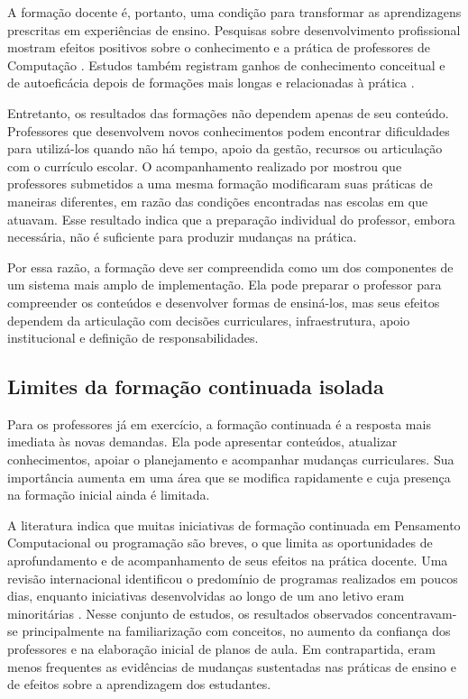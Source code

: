 A formação docente é, portanto, uma condição para transformar as aprendizagens prescritas em experiências de ensino. Pesquisas sobre desenvolvimento profissional mostram efeitos positivos sobre o conhecimento e a prática de professores de Computação \cite{ma2025effectiveness}. Estudos também registram ganhos de conhecimento conceitual e de autoeficácia depois de formações mais longas e relacionadas à prática \cite{nugent2022developing,liu2025building}.

Entretanto, os resultados das formações não dependem apenas de seu conteúdo. Professores que desenvolvem novos conhecimentos podem encontrar dificuldades para utilizá-los quando não há tempo, apoio da gestão, recursos ou articulação com o currículo escolar. O acompanhamento realizado por  mostrou que professores submetidos a uma mesma formação modificaram suas práticas de maneiras diferentes, em razão das condições encontradas nas escolas em que atuavam. Esse resultado indica que a preparação individual do professor, embora necessária, não é suficiente para produzir mudanças na prática.

Por essa razão, a formação deve ser compreendida como um dos componentes de um sistema mais amplo de implementação. Ela pode preparar o professor para compreender os conteúdos e desenvolver formas de ensiná-los, mas seus efeitos dependem da articulação com decisões curriculares, infraestrutura, apoio institucional e definição de responsabilidades.

\subsection{Limites da formação continuada isolada}
\label{subsec:limites-formacao-continuada}

Para os professores já em exercício, a formação continuada é a resposta mais imediata às novas demandas. Ela pode apresentar conteúdos, atualizar conhecimentos, apoiar o planejamento e acompanhar mudanças curriculares. Sua importância aumenta em uma área que se modifica rapidamente e cuja presença na formação inicial ainda é limitada.

A literatura indica que muitas iniciativas de formação continuada em Pensamento Computacional ou programação são breves, o que limita as oportunidades de aprofundamento e de acompanhamento de seus efeitos na prática docente. Uma revisão internacional identificou o predomínio de programas realizados em poucos dias, enquanto iniciativas desenvolvidas ao longo de um ano letivo eram minoritárias \cite{liu2024bringing}. Nesse conjunto de estudos, os resultados observados concentravam-se principalmente na familiarização com conceitos, no aumento da confiança dos professores e na elaboração inicial de planos de aula. Em contrapartida, eram menos frequentes as evidências de mudanças sustentadas nas práticas de ensino e de efeitos sobre a aprendizagem dos estudantes.

